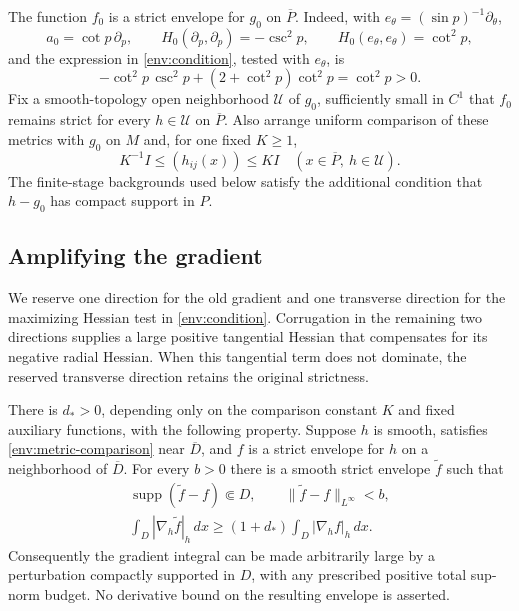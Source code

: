 The function $f_0$ is a strict envelope for $g_0$ on $\overline P$.
Indeed, with $e_\theta=(\sin p)^{-1}\partial_\theta$,
\[
 a_0=\cot p\,\partial_p,\qquad
 H_0(\partial_p,\partial_p)=-\csc^2p,\qquad
 H_0(e_\theta,e_\theta)=\cot^2p,
\]
and the expression in \eqref{env:condition}, tested with $e_\theta$,
is
\[
 -\cot^2p\,\csc^2p+(2+\cot^2p)\cot^2p=\cot^2p>0.
\]
Fix a smooth-topology open neighborhood $\mathcal U$ of $g_0$,
sufficiently small in $C^1$ that $f_0$ remains strict for every
$h\in\mathcal U$ on $\overline P$. Also arrange uniform comparison
of these metrics with $g_0$ on $M$ and, for one fixed $K\ge1$,
\begin{equation}\label{env:metric-comparison}
 K^{-1}I\le (h_{ij}(x))\le KI
       \quad (x\in\overline P,\ h\in\mathcal U).
\end{equation}
The finite-stage backgrounds used below satisfy the additional condition
that $h-g_0$ has compact support in $P$.

\subsection{Amplifying the gradient}

We reserve one direction for the old gradient and one transverse direction
for the maximizing Hessian test in \eqref{env:condition}. Corrugation in
the remaining two directions supplies a large positive tangential Hessian
that compensates for its negative radial Hessian. When this tangential
term does not dominate, the reserved transverse direction retains the
original strictness.

\begin{lemma}\label{env:amplify}
There is $d_*>0$, depending only on the comparison constant $K$ and
fixed auxiliary functions, with the following property. Suppose $h$ is
smooth, satisfies \eqref{env:metric-comparison} near $\overline D$,
and $f$ is a strict envelope for $h$ on a neighborhood of $\overline D$.
For every $b>0$ there is a smooth strict envelope $\widetilde f$ such
that
\begin{gather}
 \operatorname{supp}(\widetilde f-f)\Subset D,\qquad
 \|\widetilde f-f\|_{L^\infty}<b,\label{env:amplification-smallness}\\
 \int_D|\nabla_h\widetilde f|_h\,dx
 \ge(1+d_*)\int_D|\nabla_h f|_h\,dx.
 \label{env:amplification-gain}
\end{gather}
Consequently the gradient integral can be made arbitrarily large by a
perturbation compactly supported in $D$, with any prescribed positive
total sup-norm budget. No derivative bound on the resulting envelope
is asserted.
\end{lemma}

